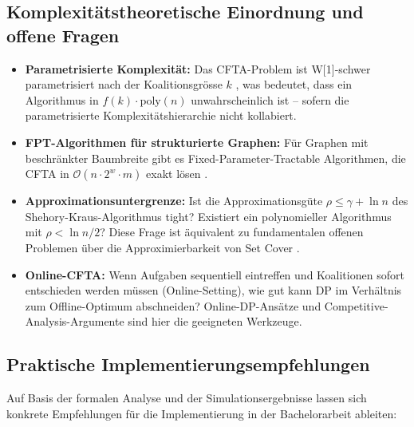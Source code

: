 ﻿\documentclass[a4paper,12pt]{article}
\theoremstyle{definition}
\begin{document}
\subsection{Komplexit\"{a}tstheoretische Einordnung und offene Fragen}

\begin{itemize}
    \item \textbf{Parametrisierte Komplexit\"{a}t:} Das CFTA-Problem ist
          W[1]-schwer parametrisiert nach der Koalitionsgr\"{o}sse $k$
          \cite{cygan2015}, was bedeutet, dass ein Algorithmus in
          $f(k) \cdot \mathrm{poly}(n)$ unwahrscheinlich ist -- sofern die
          parametrisierte Komplexit\"{a}tshierarchie nicht kollabiert.
    \item \textbf{FPT-Algorithmen f\"{u}r strukturierte Graphen:} F\"{u}r
          Graphen mit beschr\"{a}nkter Baumbreite gibt es Fixed-Parameter-Tractable
          Algorithmen, die CFTA in $\mathcal{O}(n \cdot 2^w \cdot m)$ exakt l\"{o}sen
          \cite{cygan2015}.
    \item \textbf{Approximationsuntergrenze:} Ist die Approximationsg\"{u}te
          $\rho \leq \gamma + \ln n$ des Shehory-Kraus-Algorithmus tight?
          Existiert ein polynomieller Algorithmus mit $\rho < \ln n / 2$?
          Diese Frage ist \"{a}quivalent zu fundamentalen offenen Problemen
          \"{u}ber die Approximierbarkeit von Set Cover \cite{dinur2014}.
    \item \textbf{Online-CFTA:} Wenn Aufgaben sequentiell eintreffen und
          Koalitionen sofort entschieden werden m\"{u}ssen (Online-Setting),
          wie gut kann DP im Verh\"{a}ltnis zum Offline-Optimum abschneiden?
          Online-DP-Ans\"{a}tze und Competitive-Analysis-Argumente sind hier
          die geeigneten Werkzeuge.
\end{itemize}

\subsection{Praktische Implementierungsempfehlungen}

Auf Basis der formalen Analyse und der Simulationsergebnisse lassen sich
konkrete Empfehlungen f\"{u}r die Implementierung in der Bachelorarbeit \cite{epp2026}
ableiten:
\end{document}

